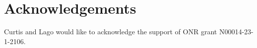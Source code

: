 \documentclass[a4paper,11pt]{article}
\begin{document}
\section*{Acknowledgements}
Curtis and Lago would like to acknowledge the support of ONR grant N00014-23-1-2106.



\end{document}
